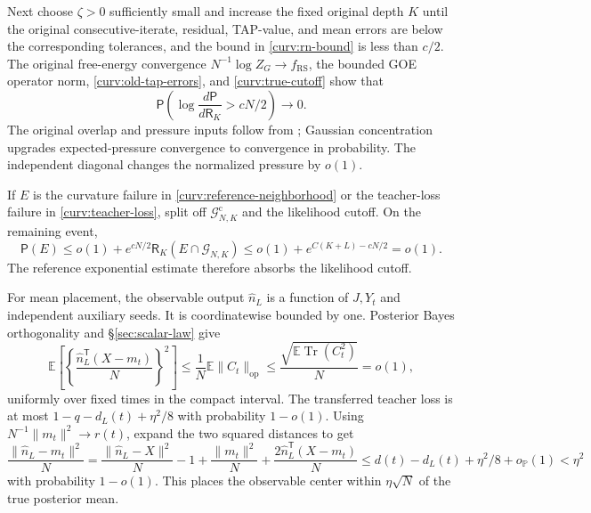 \documentclass[11pt,reqno]{amsart}
\begin{document}
Next choose $\zeta>0$ sufficiently small and increase the fixed original
depth $K$ until the original consecutive-iterate, residual, TAP-value,
and mean errors are below the corresponding tolerances, and the bound
in \eqref{curv:rn-bound} is less than $c/2$. The original free-energy
convergence $N^{-1}\log Z_G\to f_{\mathrm{RS}}$, the bounded GOE
operator norm, \eqref{curv:old-tap-errors}, and
\eqref{curv:true-cutoff} show that
\begin{equation*}
       \mathsf P\left(\log\frac{d\mathsf P}{d\mathsf R_K}>cN/2\right)
                          \longrightarrow0.
\end{equation*}
The original overlap and pressure inputs follow from
\cite[Theorem~1.1]{kusuoka2026quantitative}; Gaussian concentration \cite[Section~5.4]{boucheron2013concentration}
upgrades expected-pressure convergence to convergence in probability.
The independent diagonal changes the normalized pressure by $o(1)$.

If $E$ is the curvature failure in \eqref{curv:reference-neighborhood}
or the teacher-loss failure in \eqref{curv:teacher-loss}, split off $\mathcal G_{N,K}^{\mathrm c}$ and the
likelihood cutoff. On the remaining event,
\begin{equation}\label{curv:transfer}
 \mathsf P(E)
 \le o(1)+e^{cN/2}
       \mathsf R_K(E\cap\mathcal G_{N,K})
 \le o(1)+e^{C(K+L)-cN/2}=o(1).
\end{equation}
The reference exponential estimate therefore absorbs the likelihood
cutoff.

For mean placement, the observable output $\widehat n_L$ is a function
of $J,Y_t$ and independent auxiliary seeds. It is coordinatewise bounded
by one. Posterior Bayes orthogonality and
\S\ref{sec:scalar-law} give
\begin{equation*}
 \mathbb E\left[
    \left\{\frac{\widehat n_L^{\mathsf T}(X-m_t)}N\right\}^2\right]
       \le\frac1N\mathbb E\|C_t\|_{\mathrm{op}}
       \le\frac{\sqrt{\mathbb E\operatorname{Tr}(C_t^2)}}N=o(1),
\end{equation*}
uniformly over fixed times in the compact interval. The transferred
teacher loss is at most $1-q-d_L(t)+\eta^2/8$ with probability $1-o(1)$.
Using $N^{-1}\|m_t\|^2\to r(t)$, expand the two squared distances to get
\[
 \frac{\|\widehat n_L-m_t\|^2}{N}
 =\frac{\|\widehat n_L-X\|^2}{N}-1
         +\frac{\|m_t\|^2}{N}
         +\frac{2\widehat n_L^{\mathsf T}(X-m_t)}N
 \le d(t)-d_L(t)+\eta^2/8+o_{\mathbb P}(1)<\eta^2
\]
with probability $1-o(1)$. This places the observable center within
$\eta\sqrt N$ of the true posterior mean.
\end{document}
